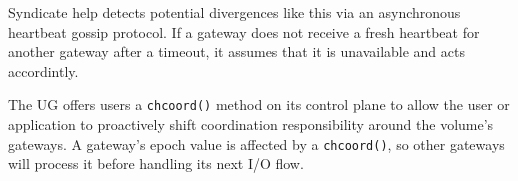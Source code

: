 Syndicate help detects potential divergences like this via an asynchronous heartbeat
gossip protocol.  If a gateway does not receive a fresh heartbeat for another gateway after
a timeout, it assumes that it is unavailable and acts accordintly.

The UG offers users a
\texttt{chcoord()} method on its control plane to allow the user or application
to proactively shift coordination responsibility around the volume's
gateways.  A gateway's epoch value is affected by a \texttt{chcoord()}, so other
gateways will process it before handling its next I/O flow.

